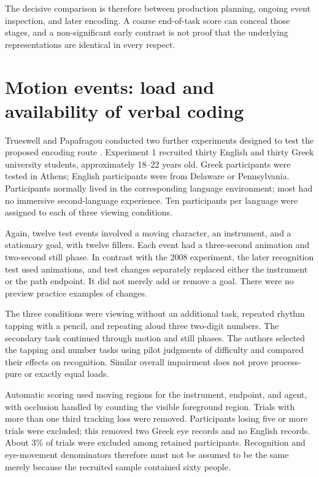 The decisive comparison is therefore between production planning,
ongoing event inspection, and later encoding. A coarse end-of-task score
can conceal those stages, and a non-significant early contrast is not
proof that the underlying representations are identical in every respect.

\section{Motion events: load and availability of verbal coding}
\label{sec:p19-lc-motion-dual-task}

Trueswell and Papafragou conducted two further experiments designed to
test the proposed encoding route
\cite[pp.~64--82]{TrueswellPapafragou2010DualTaskLC}.
Experiment 1 recruited thirty English and thirty Greek university students,
approximately 18--22 years old. Greek participants were tested in Athens;
English participants were from Delaware or Pennsylvania. Participants
normally lived in the corresponding language environment; most had no
immersive second-language experience. Ten participants per language were
assigned to each of three viewing conditions.

Again, twelve test events involved a moving character, an instrument,
and a stationary goal, with twelve fillers. Each event had a three-second
animation and two-second still phase. In contrast with the 2008 experiment,
the later recognition test used animations, and test changes separately
replaced either the instrument or the path endpoint. It did not merely
add or remove a goal. There were no preview practice examples of changes.

The three conditions were viewing without an additional task, repeated
rhythm tapping with a pencil, and repeating aloud three two-digit numbers.
The secondary task continued through motion and still phases. The authors
selected the tapping and number tasks using pilot judgments of difficulty
and compared their effects on recognition. Similar overall impairment
does not prove process-pure or exactly equal loads.

Automatic scoring used moving regions for the instrument, endpoint, and
agent, with occlusion handled by counting the visible foreground region.
Trials with more than one third tracking loss were removed. Participants
losing five or more trials were excluded; this removed two Greek eye
records and no English records. About 3\% of trials were excluded among
retained participants. Recognition and eye-movement denominators therefore
must not be assumed to be the same merely because the recruited sample
contained sixty people.

